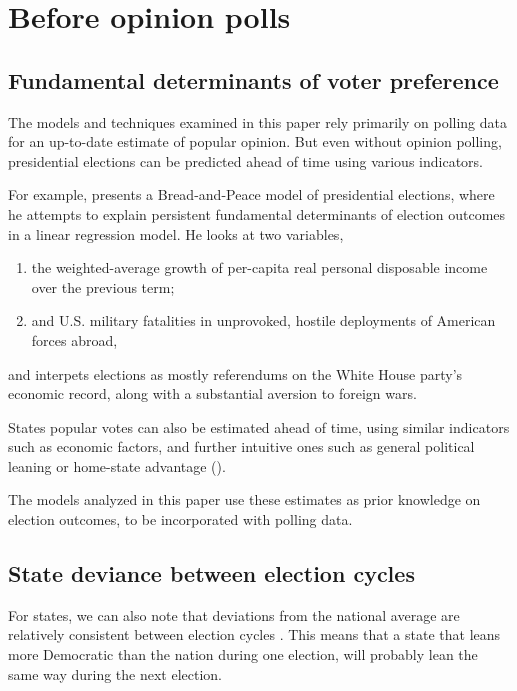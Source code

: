 \documentclass[thesis.tex]{subfiles}
\begin{document}
\section{Before opinion polls}

\subsection{Fundamental determinants of voter preference}

The models and techniques examined in this paper rely primarily on polling data for an up-to-date estimate of popular opinion. But even without opinion polling, presidential elections can be predicted ahead of time using various indicators.

For example, \cite{Hibbs:2008aa} presents a Bread-and-Peace model of presidential elections, where he attempts to explain persistent fundamental determinants of election outcomes in a linear regression model. He looks at two variables, \begin{enumerate}
	\item the weighted-average growth of per-capita real personal disposable income over the previous term;
	\item and U.S. military fatalities in unprovoked, hostile deployments of American forces abroad,
\end{enumerate} and interpets elections as mostly referendums on the White House party's economic record, along with a substantial aversion to foreign wars. 

States popular votes can also be estimated ahead of time, using similar indicators such as economic factors, and further intuitive ones such as general political leaning or home-state advantage (\citealt{Campbell:1992aa,Campbell:2006aa}).

The models analyzed in this paper use these estimates as prior knowledge on election outcomes, to be incorporated with polling data.

\subsection{State deviance between election cycles}

For states, we can also note that deviations from the national average are relatively consistent between election cycles \cite{Lock:2010aa}. This means that a state that leans more Democratic than the nation during one election, will probably lean the same way during the next election.
\end{document}
